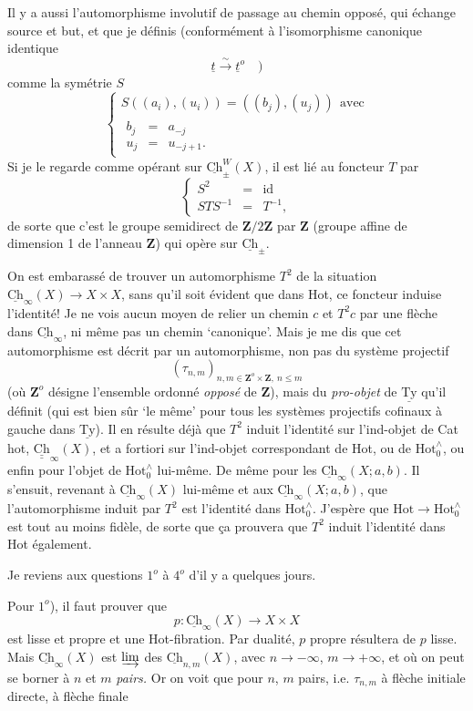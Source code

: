\documentclass[11pt]{article}
\newcommand{\msp}[1]{\marginpar{\footnotesize [#1]}}
\newcommand{\Ch}{\underline{\mathrm{Ch}}}
\newcommand{\Ty}{\underline{\mathrm{Ty}}}
\begin{document}
Il y a aussi l'automorphisme involutif de passage au chemin opposé, qui échange source et but, et que je définis (conformément à l'isomorphisme canonique identique
\[
\underline{t} \xrightarrow{\sim} \underline{t}^o \quad )
\]
comme la symétrie $S$
\[
\left\{ \begin{array}{l}
S((a_i),(u_i)) = ((b_j),(u_j)) \ \ \text{avec} \\[1ex]
\begin{array}{lcl} b_j & = & a_{-j} \\[1ex] u_j & = & u_{-j+1}. \end{array}
\end{array} \right.
\]
Si je le regarde comme opérant sur $\Ch^{W}_{\pm}(X)$, il est lié au foncteur $T$ par
\[
\left\{ \begin{array}{rcl}
S^2 & = & \mathrm{id} \\[1ex]
STS^{-1} & = & T^{-1},
\end{array} \right.
\]
de sorte que c'est le groupe semidirect de $\mathbf{Z}/2\mathbf{Z}$ par $\mathbf{Z}$ (groupe affine de dimension 1 de l'anneau $\mathbf{Z}$) qui opère sur $\Ch_{\pm}$.

\msp{page 149}
On est embarassé de trouver un automorphisme $T^2$ de la situation $\Ch_{\infty}(X) \longrightarrow X \times X$, sans qu'il soit évident que dans Hot, ce foncteur induise l'identité! Je ne vois aucun moyen de relier un chemin $c$ et $T^2 c$ par une flèche dans $\Ch_{\infty}$, ni même pas un chemin `canonique'. Mais je me dis que cet automorphisme est décrit par un automorphisme, non pas du système projectif %
\[
(\tau_{n,m})_{n,m \in \mathbf{Z}^o \times \mathbf{Z},\ n \leq m}
\]
(où $\mathbf{Z}^o$ désigne l'ensemble ordonné \textit{opposé} de $\mathbf{Z}$), mais du \textit{pro-objet} de $\Ty$ qu'il définit (qui est bien sûr `le même' pour tous les systèmes projectifs cofinaux à gauche dans $\Ty$). Il en résulte déjà que $T^2$ induit l'identité sur l'ind-objet de Cat\,hot, $\underline{\underline{\mathrm{Ch}}}_{\infty}(X)$, et a fortiori sur l'ind-objet correspondant de Hot, ou de $\mathrm{Hot}^{\wedge}_{0}$, ou enfin pour l'objet de $\mathrm{Hot}^{\wedge}_{0}$ lui-même. De même pour les $\Ch_{\infty}(X; a, b)$. Il s'ensuit, revenant à $\Ch_{\infty}(X)$ lui-même et aux $\Ch_{\infty}(X; a, b)$, que l'automorphisme induit par $T^2$ est l'identité dans $\mathrm{Hot}^{\wedge}_{0}$. J'espère que $\mathrm{Hot} \longrightarrow \mathrm{Hot}^{\wedge}_{0}$ est
\msp{page 150}
tout au moins fidèle, de sorte que ça prouvera que $T^2$ induit l'identité dans Hot également.

Je reviens aux questions $1^o$ à $4^o$ d'il y a quelques jours.

Pour $1^o$), il faut prouver que
\[
p : \Ch_{\infty}(X) \longrightarrow X \times X
\]
est lisse et propre et une Hot-fibration. Par dualité, $p$ propre résultera de $p$ lisse. Mais $\Ch_{\infty}(X)$ est $\varinjlim$ des $\Ch_{n,m}(X)$, avec $n \longrightarrow -\infty$, $m \longrightarrow +\infty$, et où on peut se borner à $n$ et $m$ \textit{pairs.} Or on voit que pour $n$, $m$ pairs, i.e. $\tau_{n,m}$ à flèche initiale directe, à flèche finale
\end{document}
